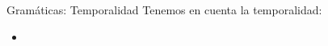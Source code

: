 \begin{frame}[t, fragile]{Gramáticas: Temporalidad}
	Tenemos en cuenta la temporalidad:
	\begin{itemize}
		\item<+-| alert@+> 
	\end{itemize}
\end{frame}



